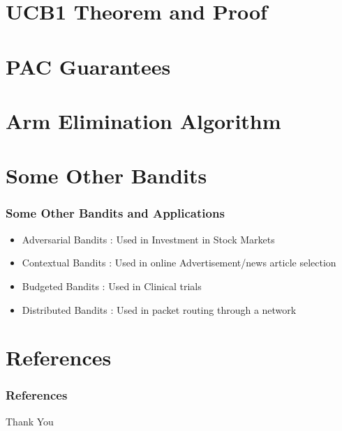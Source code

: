 \documentclass{beamer}
\begin{document}
\section{UCB1 Theorem and Proof}


\section{PAC Guarantees}


\section{Arm Elimination Algorithm}


\section{Some Other Bandits} 
\begin{frame}
\frametitle{Some Other Bandits and Applications}

\begin{itemize}
\item Adversarial Bandits : Used in Investment in Stock Markets
\item Contextual Bandits : Used in online Advertisement/news article selection
\item Budgeted Bandits : Used in Clinical trials
\item Distributed Bandits : Used in packet routing through a network
\end{itemize}
\end{frame}

\section{References}
\begin{frame}[allowframebreaks]
\frametitle{References}
 

\end{frame}



\begin{frame}
\Huge{\centerline{Thank You}}
\end{frame}

\end{document}
